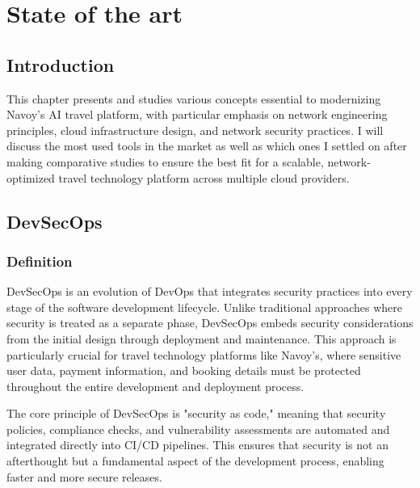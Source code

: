 \chapter{State of the art}
\minitoc
\newpage

\setcounter{secnumdepth}{0} %
\section{Introduction}
This chapter presents and studies various concepts essential to modernizing Navoy's AI travel platform, with particular emphasis on network engineering principles, cloud infrastructure design, and network security practices.
I will discuss the most used tools in the market as well as which ones I settled on after making comparative studies to ensure the best fit for a scalable, network-optimized travel technology platform across multiple cloud providers.

\setcounter{secnumdepth}{2} %
\section{DevSecOps}

\subsection{Definition}
DevSecOps is an evolution of DevOps that integrates security practices into every stage of the software development lifecycle. Unlike traditional approaches where security is treated as a separate phase, DevSecOps embeds security considerations from the initial design through deployment and maintenance. This approach is particularly crucial for travel technology platforms like Navoy's, where sensitive user data, payment information, and booking details must be protected throughout the entire development and deployment process.

The core principle of DevSecOps is "security as code," meaning that security policies, compliance checks, and vulnerability assessments are automated and integrated directly into CI/CD pipelines. This ensures that security is not an afterthought but a fundamental aspect of the development process, enabling faster and more secure releases.

